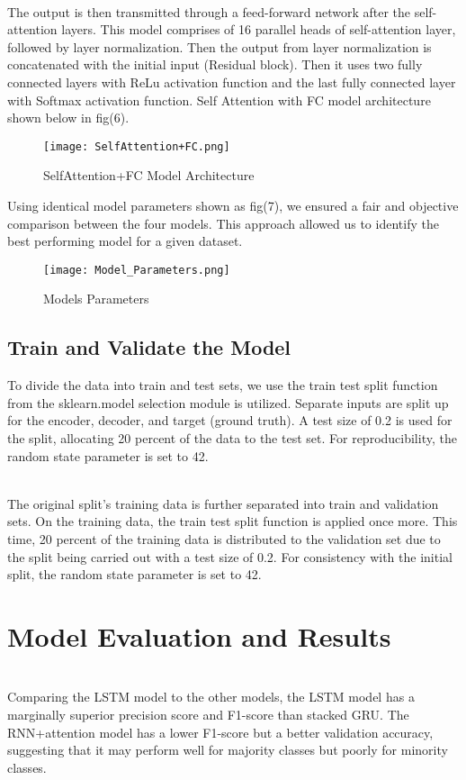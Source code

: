 \documentclass[conference]{IEEEtran}
\begin{document}
\\ The output is then transmitted through a feed-forward network after the self-attention layers. This model comprises of 16 parallel heads of self-attention layer, followed by layer normalization. Then the output from layer normalization is concatenated with the initial input (Residual block). Then it uses two fully connected layers with ReLu activation function and the last fully connected layer with Softmax activation function. Self Attention with FC model architecture shown below in fig(6).

\begin{figure}[htbp]
\centerline{\texttt{[image: SelfAttention+FC.png]}}
\caption{SelfAttention+FC Model Architecture}
\label{fig}
\end{figure}

Using identical model parameters shown as fig(7), we ensured a fair and objective comparison between the four models. This approach allowed us to identify the best performing model for a given dataset. 

\begin{figure}[htbp]
\centerline{\texttt{[image: Model\_Parameters.png]}}
\caption{Models Parameters}
\label{fig}
\end{figure}

\subsection{Train and Validate the Model}
To divide the data into train and test sets, we use the train test split function from the sklearn.model selection module is utilized.
Separate inputs are split up for the encoder, decoder, and target (ground truth). A test size of 0.2 is used for the split, allocating 20 percent of the data to the test set. For reproducibility, the random state parameter is set to 42.

\\ The original split's training data is further separated into train and validation sets. On the training data, the train test split function is applied once more. This time, 20 percent of the training data is distributed to the validation set due to the split being carried out with a test size of 0.2. For consistency with the initial split, the random state parameter is set to 42.

\section{Model Evaluation and Results}
\\ Comparing the LSTM model to the other models, the LSTM model has a marginally superior precision score and F1-score than stacked GRU.
The RNN+attention model has a lower F1-score but a better validation accuracy, suggesting that it may perform well for majority classes but poorly for minority classes. 
\end{document}
